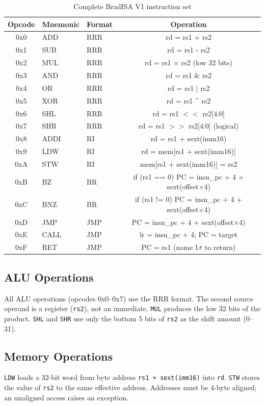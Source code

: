 \documentclass[11pt,a4paper]{article}
\begin{document}
\begin{table}[H]
\centering
\caption{Complete BradISA V1 instruction set}
\begin{tabular}{cllc}
\toprule
Opcode & Mnemonic & Format & Operation \\
\midrule
0x0 & ADD  & RRR & rd = rs1 + rs2 \\
0x1 & SUB  & RRR & rd = rs1 - rs2 \\
0x2 & MUL  & RRR & rd = rs1 $\times$ rs2 (low 32 bits) \\
0x3 & AND  & RRR & rd = rs1 \& rs2 \\
0x4 & OR   & RRR & rd = rs1 | rs2 \\
0x5 & XOR  & RRR & rd = rs1 \^{} rs2 \\
0x6 & SHL  & RRR & rd = rs1 $<<$ rs2[4:0] \\
0x7 & SHR  & RRR & rd = rs1 $>>$ rs2[4:0] (logical) \\
\midrule
0x8 & ADDI & RI  & rd = rs1 + sext(imm16) \\
0x9 & LDW  & RI  & rd = mem[rs1 + sext(imm16)] \\
0xA & STW  & RI  & mem[rs1 + sext(imm16)] = rs2 \\
\midrule
0xB & BZ   & BR  & if (rs1 == 0) PC = insn\_pc + 4 + sext(offset$\times$4) \\
0xC & BNZ  & BR  & if (rs1 != 0) PC = insn\_pc + 4 + sext(offset$\times$4) \\
0xD & JMP  & JMP & PC = insn\_pc + 4 + sext(offset$\times$4) \\
0xE & CALL & JMP & lr = insn\_pc + 4; PC = target \\
0xF & RET  & JMP & PC = rs1 (name {\tt lr} to return) \\
\bottomrule
\end{tabular}
\end{table}

\subsection{ALU Operations}
All ALU operations (opcodes 0x0--0x7) use the RRR format. The second source
operand is a register ({\tt rs2}), not an immediate. {\tt MUL} produces the
low 32 bits of the product. {\tt SHL} and {\tt SHR} use only the bottom 5 bits
of {\tt rs2} as the shift amount (0--31).

\subsection{Memory Operations}
{\tt LDW} loads a 32-bit word from byte address {\tt rs1 + sext(imm16)} into
{\tt rd}.  {\tt STW} stores the value of {\tt rs2} to the same effective
address.  Addresses must be 4-byte aligned; an unaligned access raises an
exception.
\end{document}

